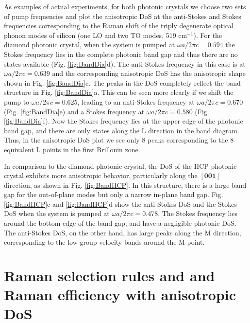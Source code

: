 \documentclass[%
 reprint,
superscriptaddress,
 amsmath,amssymb,
 aps,
pra,
]{revtex4-1}
\begin{document}
As examples of actual experiments, for both photonic crystals we choose two sets of pump frequencies and plot the anisotropic DoS at the anti-Stokes and Stokes frequencies corresponding to the Raman shift of the triply degenerate optical phonon modes of silicon (one LO and two TO modes, 519 cm$^{-1}$). For the diamond photonic crystal, when the system is pumped at $\omega a/2\pi c=0.594$ the Stokes frequency lies in the complete photonic band gap and thus there are no states available (Fig. \ref{fig:BandDia}d). The anti-Stokes frequency in this case is at $\omega a/2\pi c=0.639$ and the corresponding anisotropic DoS has the anisotropic shape shown in Fig. \ref{fig:BandDia}c. The peaks in the DoS completely reflect the band structure in Fig. \ref{fig:BandDia}a. This can be seen more clearly if we shift the pump to $\omega a/2\pi c=0.625$, leading to an anti-Stokes frequency at $\omega a/2\pi c=0.670$ (Fig. \ref{fig:BandDia}e) and a Stokes frequency at $\omega a/2\pi c=0.580$ (Fig. \ref{fig:BandDia}f). Now the Stokes frequency lies at the upper edge of the photonic band gap, and there are only states along the L direction in the band diagram. Thus, in the anisotropic DoS plot we see only 8 peaks corresponding to the 8 equivalent L points in the first Brillouin zone.

In comparison to the diamond photonic crystal, the DoS of the HCP photonic crystal exhibits more anisotropic behavior, particularly along the $[\textbf{001}]$ direction, as shown in Fig. \ref{fig:BandHCP}. In this structure, there is a large band gap for the out-of-plane modes but only a narrow in-plane band gap. Fig. \ref{fig:BandHCP}c and \ref{fig:BandHCP}d show the anti-Stokes DoS and the Stokes DoS when the system is pumped at $\omega a/2\pi c=0.478$. The Stokes frequency lies around the bottom edge of the band gap, and have a negligible photonic DoS. The anti-Stokes DoS, on the other hand, has large peaks along the M direction, corresponding to the low-group velocity bands around the M point.



\section{Raman selection rules and and Raman efficiency with anisotropic DoS}\label{sec:RSR}
\end{document}
